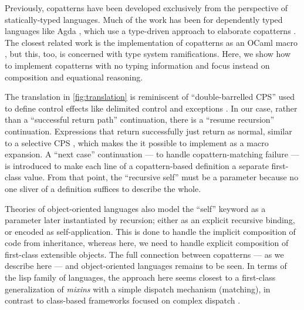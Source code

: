Previously, copatterns have been developed exclusively from the perspective of statically-typed languages.
Much of the work has been for dependently typed languages like Agda \cite{ElaboratingDependentCopatterns}, which use a type-driven approach to elaborate copatterns \cite{UnnestingCopatterns,ThibodeauMasters}.
The closest related work is the implementation of copatterns as an OCaml macro \cite{LaforgueR17}, but this, too, is concerned with type system ramifications.
Here, we show how to implement copatterns with no typing information and focus instead on composition and equational reasoning.

The translation in \cref{fig:translation} is reminiscent of ``double-barrelled CPS'' \cite{DoubleBarrelCPS} used to define control effects like delimited control \cite{AbstractingControl} and exceptions \cite{KimYiDanvy98}.
In our case, rather than a ``successful return path'' continuation, there is a ``resume recursion'' continuation.
Expressions that return successfully just return as normal, similar to a selective CPS \cite{SelectiveCPS}, which makes the it possible to implement as a macro expansion.
A ``next case'' continuation --- to handle copattern-matching failure --- is introduced to make each line of a copattern-based definition a separate first-class value.
From that point, the ``recursive self'' must be a parameter because no one sliver of a definition suffices to describe the whole.

Theories of object-oriented languages \cite{abadi96,CookP94} also model the ``self'' keyword as a parameter later instantiated by recursion; either as an explicit recursive binding, or encoded as self-application.
This is done to handle the implicit composition of code from inheritance, whereas here, we need to handle explicit composition of first-class extensible objects.
The full connection between copatterns --- as we describe here --- and object-oriented languages remains to be seen.
In terms of the lisp family of languages, the approach here seems closest to a first-class generalization of \emph{mixins} \cite{BrachaC90Mixins,flatt1998mixin} with a simple dispatch mechanism (matching), in contrast to class-based frameworks focused on complex dispatch \cite{CLOS,Ingalls86,chambers1992}.



